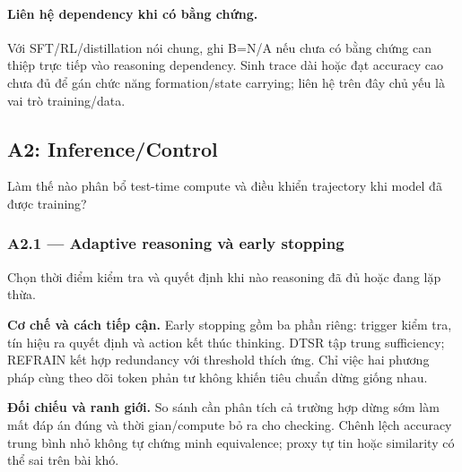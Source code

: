 \paragraph{Liên hệ dependency khi có bằng chứng.}
Với SFT/RL/distillation nói chung, ghi B=N/A nếu chưa có bằng chứng can thiệp trực tiếp vào reasoning dependency. Sinh trace dài hoặc đạt accuracy cao chưa đủ để gán chức năng formation/state carrying; liên hệ trên đây chủ yếu là vai trò training/data.

\subsection{A2: Inference/Control}
\label{subsec:a2_review}

Làm thế nào phân bổ test-time compute và điều khiển trajectory khi model đã được training?

\subsubsection*{A2.1 — Adaptive reasoning và early stopping}
Chọn thời điểm kiểm tra và quyết định khi nào reasoning đã đủ hoặc đang lặp thừa.

\noindent\textbf{Cơ chế và cách tiếp cận.} Early stopping gồm ba phần riêng: trigger kiểm tra, tín hiệu ra quyết định và action kết thúc thinking. DTSR tập trung sufficiency; REFRAIN kết hợp redundancy với threshold thích ứng. Chỉ việc hai phương pháp cùng theo dõi token phản tư không khiến tiêu chuẩn dừng giống nhau.\par
\noindent\textbf{Đối chiếu và ranh giới.} So sánh cần phân tích cả trường hợp dừng sớm làm mất đáp án đúng và thời gian/compute bỏ ra cho checking. Chênh lệch accuracy trung bình nhỏ không tự chứng minh equivalence; proxy tự tin hoặc similarity có thể sai trên bài khó.\par

